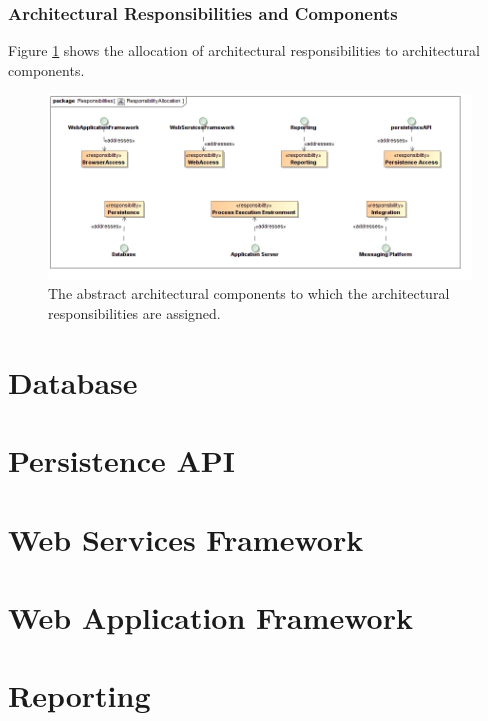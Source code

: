 \subsubsection{Architectural Responsibilities and Components}
Figure \ref{fig:architectureResponsibilityAllocation} shows the allocation of
architectural responsibilities to architectural components. 
\begin{figure}[H]
	\begin{center}
	\includegraphics[scale=0.5]{../Diagrams and Charts/Architecture/ResponsibilityAllocation.jpg}
	\caption{The abstract architectural components to which the architectural responsibilities are
assigned.}
  \label{fig:architectureResponsibilityAllocation}
	\end{center}
\end{figure}

\section{Database}


\section{Persistence API}


\section{Web Services Framework}


\section{Web Application Framework}


\section{Reporting}

